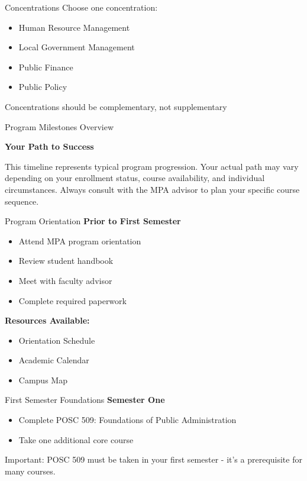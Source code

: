 \documentclass[10pt]{beamer}
\begin{document}
\begin{frame}{Concentrations}
Choose one concentration:
\begin{itemize}
\item Human Resource Management
\item Local Government Management
\item Public Finance
\item Public Policy
\end{itemize}
Concentrations should be complementary, not supplementary
\end{frame}


\begin{frame}{Program Milestones Overview}
    \begin{center}
    \textbf{Your Path to Success}
    \end{center}
    \small{This timeline represents typical program progression. Your actual path may vary depending on your enrollment status, course availability, and individual circumstances. Always consult with the MPA advisor to plan your specific course sequence.}
    \end{frame}
    
    \begin{frame}{Program Orientation}
    \textbf{Prior to First Semester}
    \begin{itemize}
    \item Attend MPA program orientation
    \item Review student handbook
    \item Meet with faculty advisor
    \item Complete required paperwork
    \end{itemize}
    
    \textbf{Resources Available:}
    \begin{itemize}
    \item Orientation Schedule
    \item Academic Calendar
    \item Campus Map
    \end{itemize}
    \end{frame}
    
    \begin{frame}{First Semester Foundations}
    \textbf{Semester One}
    \begin{itemize}
    \item Complete POSC 509: Foundations of Public Administration
    \item Take one additional core course
    \end{itemize}
    
    \alert{Important:} POSC 509 must be taken in your first semester - it's a prerequisite for many courses.
    \end{frame}
    
\end{document}
